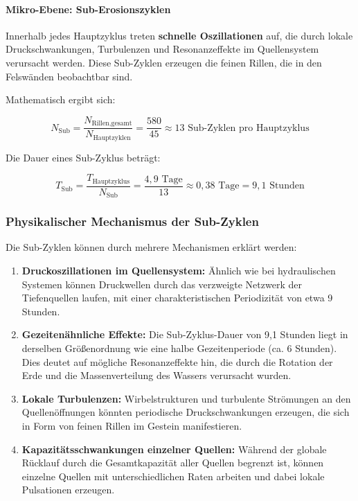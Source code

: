 \paragraph{Mikro-Ebene: Sub-Erosionszyklen}

Innerhalb jedes Hauptzyklus treten \textbf{schnelle Oszillationen} auf, die durch lokale Druckschwankungen, Turbulenzen und Resonanzeffekte im Quellensystem verursacht werden. Diese Sub-Zyklen erzeugen die feinen Rillen, die in den Felswänden beobachtbar sind.

Mathematisch ergibt sich:

\begin{equation}
	N_{\text{Sub}} = \frac{N_{\text{Rillen,gesamt}}}{N_{\text{Hauptzyklen}}} = \frac{580}{45} \approx 13 \text{ Sub-Zyklen pro Hauptzyklus}
\end{equation}

Die Dauer eines Sub-Zyklus beträgt:

\begin{equation}
	T_{\text{Sub}} = \frac{T_{\text{Hauptzyklus}}}{N_{\text{Sub}}} = \frac{4{,}9 \text{ Tage}}{13} \approx 0{,}38 \text{ Tage} = 9{,}1 \text{ Stunden}
\end{equation}

\subsubsection{Physikalischer Mechanismus der Sub-Zyklen}

Die Sub-Zyklen können durch mehrere Mechanismen erklärt werden:

\begin{enumerate}
	\item \textbf{Druckoszillationen im Quellensystem:} Ähnlich wie bei hydraulischen Systemen können Druckwellen durch das verzweigte Netzwerk der Tiefenquellen laufen, mit einer charakteristischen Periodizität von etwa 9 Stunden.
	
	\item \textbf{Gezeitenähnliche Effekte:} Die Sub-Zyklus-Dauer von 9,1 Stunden liegt in derselben Größenordnung wie eine halbe Gezeitenperiode (ca. 6 Stunden). Dies deutet auf mögliche Resonanzeffekte hin, die durch die Rotation der Erde und die Massenverteilung des Wassers verursacht wurden.
	
	\item \textbf{Lokale Turbulenzen:} Wirbelstrukturen und turbulente Strömungen an den Quellenöffnungen könnten periodische Druckschwankungen erzeugen, die sich in Form von feinen Rillen im Gestein manifestieren.
	
	\item \textbf{Kapazitätsschwankungen einzelner Quellen:} Während der globale Rücklauf durch die Gesamtkapazität aller Quellen begrenzt ist, können einzelne Quellen mit unterschiedlichen Raten arbeiten und dabei lokale Pulsationen erzeugen.
\end{enumerate}

